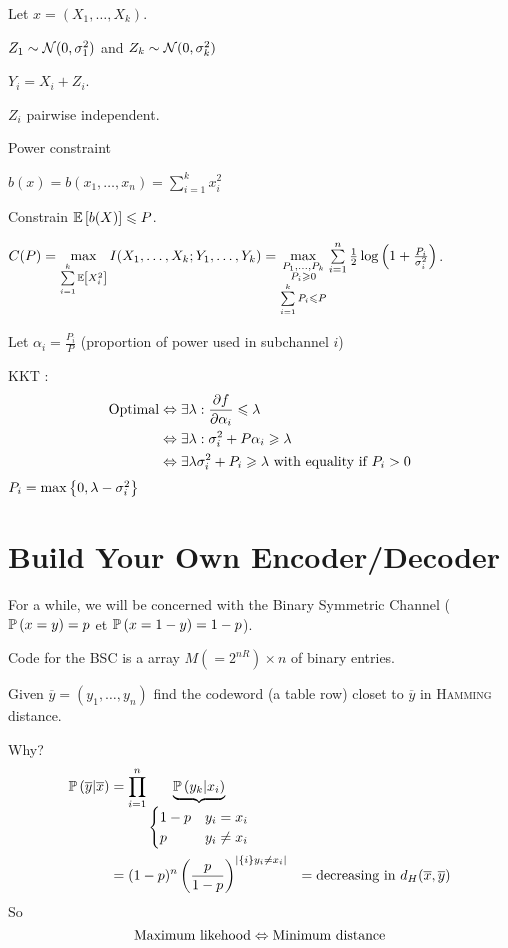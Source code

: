 Let $x = (X_1,\ldots,X_k)$.

$Z_1 \sim\mathcal{N}(0,\sigma_1^2)$ and  $Z_k \sim\mathcal{N}(0,\sigma_k^2)$

$Y_i = X_i + Z_i$.

$Z_i$ pairwise independent.

Power constraint

$b(x) = b(x_1,\ldots,x_n) = \sum\limits_{i=1}^k x_i^2$

Constrain $\mathbb{E}\left[ b(X) \right] \leqslant P$.

$C(P) = \max\limits_{\sum\limits_{i=1}^k \mathbb{E}\left[ X_i^2 \right]} I(X_1,\ldots,X_k ; Y_1,\ldots, Y_k) = \max\limits_{\substack{P_1,\ldots,P_k\\P_i \geqslant 0\\\sum\limits_{i=1}^k P_i \leqslant P}} \sum\limits_{i=1}^n\frac{1}{2} \log\left(1+\frac{P_i}{\sigma_i^2}\right)$.

Let $\alpha_i=\frac{P_i}{P}$ (proportion of power used in subchannel $i$)

KKT : 
\[
    \begin{aligned}
        \text{Optimal} &\Leftrightarrow \exists \lambda: \frac{\partial f}{\partial \alpha_i} \leqslant\lambda\\
        &\Leftrightarrow \exists \lambda : \sigma_i^2+P\alpha_i \geqslant \lambda\\
        &\Leftrightarrow \exists \lambda \sigma_i^2+P_i \geqslant \lambda \text{ with equality if }P_i > 0
    \end{aligned}
\]
$P_i = \max\left\{ 0,\lambda - \sigma_i^2 \right\}$

\section{Build Your Own Encoder/Decoder}

For a while, we will be concerned with the Binary Symmetric Channel  ($\mathbb{P}\left( x=y \right) = p$ et $\mathbb{P}\left( x=1-y \right) = 1-p$).

Code for the BSC is a array $M (=2^{nR}) \times n$ of binary entries.

Given $\overline{y} = (y_1,\ldots,y_n)$ find the codeword (a table row) closet to $\overline{y}$ in \textsc{Hamming} distance.

Why?
\[
    \begin{aligned}
        \mathbb{P}\left( \overline{y}\vert \overline{x} \right) &= \prod\limits_{i=1}^n \underbrace{\mathbb{P}\left( y_k \vert x_i \right)}_{\begin{cases}1-p & y_i = x_i\\p & y_i \neq x_i\end{cases}}\\
        &= (1-p)^n \left( \frac{p}{1-p} \right)^{\left\lvert\left\{ i \right\}{y_i\neq x_i}\right\rvert}
        &= \text{decreasing in }d_H(\overline{x},\overline{y})
    \end{aligned}
\]
So
\[
    \text{Maximum likehood} \Leftrightarrow \text{Minimum distance}
\]

